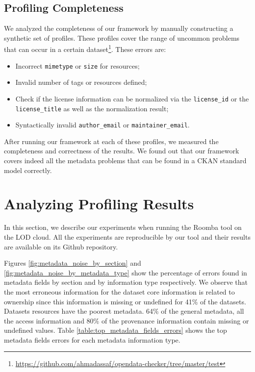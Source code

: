 \subsection{Profiling Completeness}
We analyzed the completeness of our framework by manually constructing a synthetic set of profiles. These profiles cover the range of uncommon problems that can occur in a certain dataset\footnote{\url{https://github.com/ahmadassaf/opendata-checker/tree/master/test}}. These errors are:
\begin{itemize}
 \item Incorrect \texttt{mimetype} or \texttt{size} for resources;
 \item Invalid number of tags or resources defined;
 \item Check if the license information can be normalized via the \texttt{license\_id} or the \texttt{license\_title} as well as the normalization result;
 \item Syntactically invalid \texttt{author\_email} or \texttt{maintainer\_email}.
\end{itemize}

After running our framework at each of these profiles, we measured the completeness and correctness of the results. We found out that our framework covers indeed all the metadata problems that can be found in a CKAN standard model correctly.

\section{Analyzing Profiling Results} \label{section:running_roomba}

In this section, we describe our experiments when running the Roomba tool on the LOD cloud. All the experiments are reproducible by our tool and their results are available on its Github repository.

Figures \ref{fig:metadata_noise_by_section} and \ref{fig:metadata_noise_by_metadata_type} show the percentage of errors found in metadata fields by section and by information type respectively. We observe that the most erroneous information for the dataset core information is related to ownership since this information is missing or undefined for 41\% of the datasets. Datasets resources have the poorest metadata. 64\% of the general metadata, all the access information and 80\% of the provenance information contain missing or undefined values. Table \ref{table:top_metadata_fields_errors} shows the top metadata fields errors for each metadata information type.


